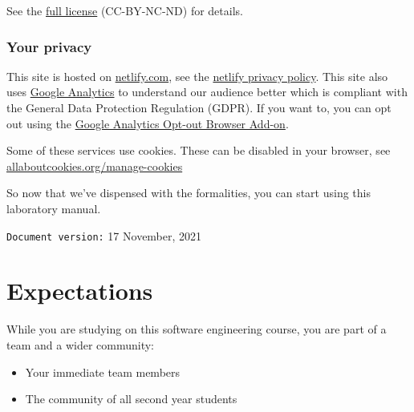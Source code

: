 \documentclass[
]{book}
\providecommand{\tightlist}{%
  \setlength{\itemsep}{0pt}\setlength{\parskip}{0pt}}
\begin{document}
See the \href{https://creativecommons.org/licenses/by-nc-nd/3.0/}{full license} (CC-BY-NC-ND) for details.

\hypertarget{privacy}{%
\subsection{Your privacy}\label{privacy}}

This site is hosted on \href{https://www.netlify.com/}{netlify.com}, see the \href{https://www.netlify.com/privacy/}{netlify privacy policy}. This site also uses \href{https://en.wikipedia.org/wiki/Google_Analytics}{Google Analytics} to understand our audience better which is compliant with the General Data Protection Regulation (GDPR). If you want to, you can opt out using the \href{https://tools.google.com/dlpage/gaoptout/}{Google Analytics Opt-out Browser Add-on}.

Some of these services use cookies. These can be disabled in your browser, see \href{https://www.allaboutcookies.org/manage-cookies/}{allaboutcookies.org/manage-cookies}

So now that we've dispensed with the formalities, you can start using this laboratory manual.





































\texttt{Document\ version:} 17 November, 2021

\hypertarget{expectations}{%
\chapter*{Expectations}\label{expectations}}

While you are studying on this software engineering course, you are part of a team and a wider community:

\begin{itemize}
\tightlist
\item
  Your immediate team members
\item
  The community of all second year students
\end{itemize}
\end{document}
